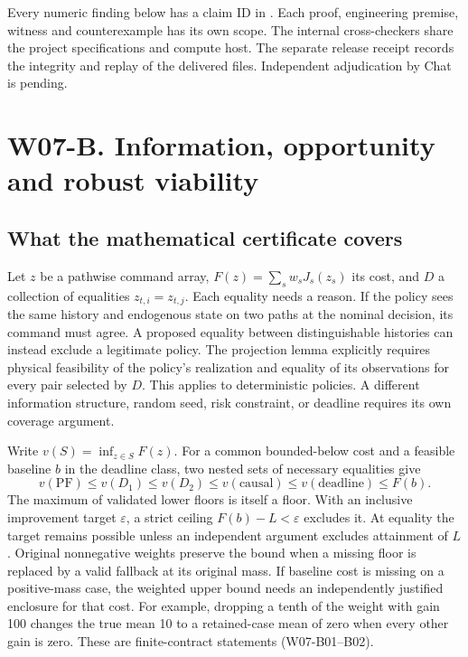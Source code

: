 \documentclass[11pt,letterpaper]{article}
\begin{document}
Every numeric finding below has a claim ID in . Each proof, engineering premise, witness and counterexample has its own scope. The internal cross-checkers share the project specifications and compute host. The separate release receipt records the integrity and replay of the delivered files. Independent adjudication by Chat is pending.
\section{W07-B. Information, opportunity and robust viability}
\label{sec:w07formal}

\subsection{What the mathematical certificate covers}
Let $z$ be a pathwise command array, $F(z)=\sum_s w_s J_s(z_s)$ its cost, and $D$ a collection of equalities $z_{t,i}=z_{t,j}$. Each equality needs a reason. If the policy sees the same history and endogenous state on two paths at the nominal decision, its command must agree. A proposed equality between distinguishable histories can instead exclude a legitimate policy. The projection lemma explicitly requires physical feasibility of the policy's realization and equality of its observations for every pair selected by $D$. This applies to deterministic policies. A different information structure, random seed, risk constraint, or deadline requires its own coverage argument.

Write $v(S)=\inf_{z\in S} F(z)$. For a common bounded-below cost and a feasible baseline $b$ in the deadline class, two nested sets of necessary equalities give
\[
v(\mathrm{PF}) \le v(D_1)\le v(D_2)\le v(\mathrm{causal})
\le v(\mathrm{deadline})\le F(b).
\]
The maximum of validated lower floors is itself a floor. With an inclusive improvement target $\varepsilon$, a strict ceiling $F(b)-L<\varepsilon$ excludes it. At equality the target remains possible unless an independent argument excludes attainment of $L$. Original nonnegative weights preserve the bound when a missing floor is replaced by a valid fallback at its original mass. If baseline cost is missing on a positive-mass case, the weighted upper bound needs an independently justified enclosure for that cost. For example, dropping a tenth of the weight with gain 100 changes the true mean 10 to a retained-case mean of zero when every other gain is zero. These are finite-contract statements (W07-B01--B02).
\end{document}
